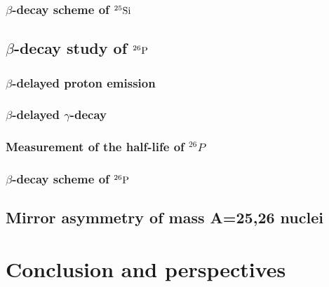 \documentclass[UTF8]{ctexart}
\begin{document}
\subsubsection{$\beta$-decay scheme of $^{25}\textnormal{Si}$}
\subsection{$\beta$-decay study of $^{26}\textnormal{P}$}
\subsubsection{$\beta$-delayed proton emission}
\subsubsection{$\beta$-delayed $\gamma$-decay}
\subsubsection{Measurement of the half-life of $^{26}P$}
\subsubsection{$\beta$-decay scheme of $^{26}\textnormal{P}$}
\subsection{Mirror asymmetry of mass A=25,26 nuclei}
\section{Conclusion and perspectives}
\end{document}
